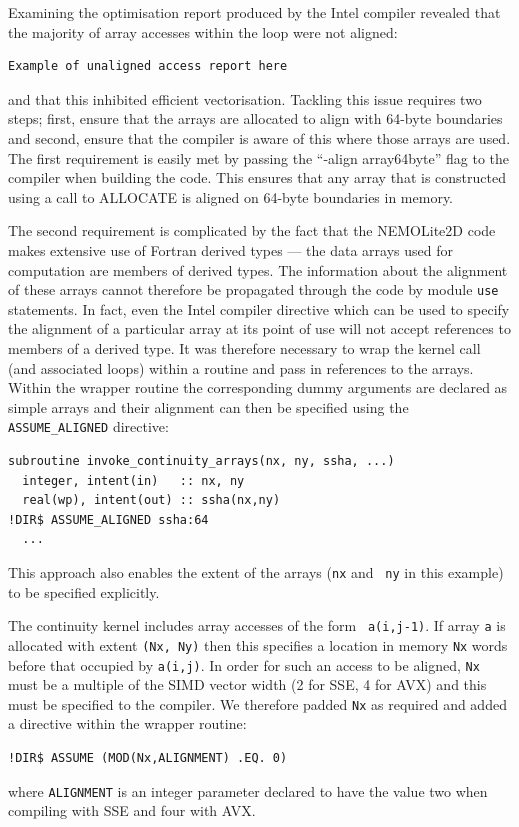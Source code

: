 \documentclass[12pt]{article}
\begin{document}
Examining the optimisation report produced by the Intel compiler
revealed that the majority of array accesses within the loop were not
aligned:
\begin{verbatim}
Example of unaligned access report here
\end{verbatim}
and that this inhibited efficient vectorisation. Tackling this issue
requires two steps; first, ensure that the arrays are allocated to
align with 64-byte boundaries and second, ensure that the compiler is
aware of this where those arrays are used. The first requirement is
easily met by passing the ``-align array64byte'' flag to
the compiler when building the code. This ensures that any array that
is constructed using a call to ALLOCATE is aligned on 64-byte
boundaries in memory.

The second requirement is complicated by the fact that the NEMOLite2D
code makes extensive use of Fortran derived types --- the data arrays
used for computation are members of derived types. The information
about the alignment of these arrays cannot therefore be propagated
through the code by module {\tt use} statements. In fact, even the
Intel compiler directive which can be used to specify the alignment
of a particular array at its point of use will not accept references
to members of a derived type. It was therefore necessary to wrap the
kernel call (and associated loops) within a routine and pass in
references to the arrays. Within the wrapper routine the corresponding
dummy arguments are declared as simple arrays and their alignment can
then be specified using the {\tt ASSUME\_ALIGNED} directive:
\begin{verbatim}
subroutine invoke_continuity_arrays(nx, ny, ssha, ...)
  integer, intent(in)   :: nx, ny
  real(wp), intent(out) :: ssha(nx,ny)
!DIR$ ASSUME_ALIGNED ssha:64
  ...
\end{verbatim}
This approach also enables the extent of the arrays ({\tt nx} and {\tt
  ny} in this example) to be specified explicitly.

The continuity kernel includes array accesses of the form {\tt
  a(i,j-1)}. If array {\tt a} is allocated with extent {\tt (Nx, Ny)}
then this specifies a location in memory {\tt Nx} words before that
occupied by {\tt a(i,j)}. In order for such an access to be aligned,
{\tt Nx} must be a multiple of the SIMD vector width (2 for SSE, 4 for
AVX) and this must be specified to the compiler. We therefore padded {\tt Nx}
as required and added a directive within the wrapper routine:
\begin{verbatim}
!DIR$ ASSUME (MOD(Nx,ALIGNMENT) .EQ. 0)
\end{verbatim}
where {\tt ALIGNMENT} is an integer parameter declared to have the value two
when compiling with SSE and four with AVX.
\end{document}
